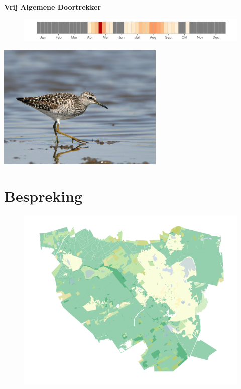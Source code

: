 \documentclass[11pt]{book}
\begin{document}
\textbf{Vrij Algemene Doortrekker} 
\vspace{5mm} %

 \begin{figure}[H]
  \includegraphics{Kalender/Bosruiter.pdf}
  \end{figure}

\begin{multicols}{2}

\includegraphics[width=8cm]{Foto's/Bosruiter.jpg}
\section{Bespreking}

\lipsum[1-2]


  \begin{figure}[H]
  \includegraphics{Grenspark/Bosruiter.pdf}
  \end{figure}
  

\end{multicols}
\end{document}
